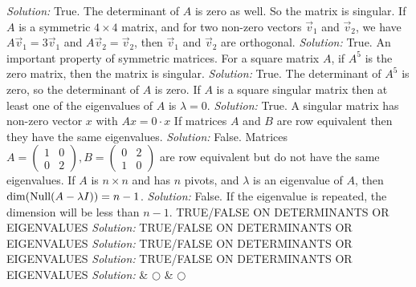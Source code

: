     \ifnum {} {\color{DarkBlue} \textit{Solution:  } True. The determinant of $A$ is zero as well. So the matrix is singular.   } \fi
\fi     
\ifnum {}
    If $A$ is a symmetric $4\times 4$ matrix, and  for two non-zero vectors $\vec v_1$ and $\vec v_2$, we have $A \vec v_1= 3 \vec v_1 $ and $A \vec v_2=\vec v_2$, then $\vec v_1$ and $\vec v_2$ are orthogonal. 
    \ifnum {} {\color{DarkBlue} \textit{Solution:  } True. An important property of symmetric matrices.  } \fi
\fi     
\ifnum {}
      For a square matrix $A$, if  $A^5$ is the zero matrix,  then the matrix is singular. 
    \ifnum {} {\color{DarkBlue} \textit{Solution:  }  True. The determinant of $A^5$ is zero, so the determinant of $A$ is zero.  } \fi
\fi     
\ifnum {}
    If $A$ is a square singular matrix then at least one of the eigenvalues of $A$ is $\lambda=0$. 
    \ifnum {} {\color{DarkBlue} \textit{Solution:  } True. A singular matrix has non-zero vector $x$ with $Ax=0 \cdot x$ } \fi
\fi    
\ifnum {}
    If matrices $A$ and $B$ are row equivalent then they have the same eigenvalues. 
    \ifnum {} \setlength{\extrarowheight}{0.0cm} {\color{DarkBlue} \textit{Solution:  } False. Matrices $A = \begin{pmatrix} 1&0\\0&2\end{pmatrix}, B = \begin{pmatrix} 0&2\\1&0\end{pmatrix}$ are row equivalent but do not have the same eigenvalues. } \fi
\fi    
\ifnum {}
    If $A$ is $n\times n$ and has $n$ pivots, and $\lambda$ is an eigenvalue of $A$, then $\dim(\text{Null} (A - \lambda I)) = n-1$. 
    \ifnum {} {\color{DarkBlue} \textit{Solution:  } False. If the eigenvalue is repeated, the dimension will be less than $n-1$. } \fi
\fi    
\ifnum {}
    TRUE/FALSE ON DETERMINANTS OR EIGENVALUES
    \ifnum {} {\color{DarkBlue} \textit{Solution:  }  } \fi
\fi    
\ifnum {}
    TRUE/FALSE ON DETERMINANTS OR EIGENVALUES
    \ifnum {} {\color{DarkBlue} \textit{Solution:  }  } \fi
\fi    
\ifnum {}
    TRUE/FALSE ON DETERMINANTS OR EIGENVALUES
    \ifnum {} {\color{DarkBlue} \textit{Solution:  }  } \fi
\fi    
\ifnum {}
    TRUE/FALSE ON DETERMINANTS OR EIGENVALUES
    \ifnum {} {\color{DarkBlue} \textit{Solution:  }  } \fi
\fi    
& $\bigcirc$  & $\bigcirc$ \\   
